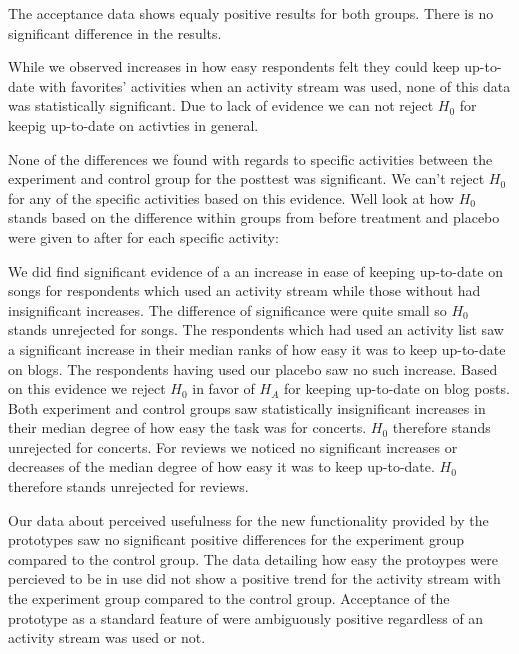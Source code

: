 The acceptance data shows equaly positive results for both groups. There is no
significant difference in the results.

\parabreak

While we observed increases in how easy respondents felt they could keep
up-to-date with favorites' activities when an activity stream was used,
none of this data was statistically significant. Due to lack of evidence we
can not reject $H_0$ for keepig up-to-date on activties in general.

None of the differences we found with regards to specific activities between
the experiment and control group for the posttest was significant.
We can't reject $H_0$ for any of the specific activities based on this
evidence. Well look at how $H_0$ stands based on the difference within groups
from before treatment and placebo were given to after for each specific
activity:

\begin{items}
   We did find significant evidence
    of a an increase in ease of keeping up-to-date on songs for respondents
    which used an activity stream while those without had insignificant
    increases. The difference of significance were quite small so $H_0$
    stands unrejected for songs.
   The respondents which had used an activity list saw a
    significant increase in their median ranks of how easy it was
    to keep up-to-date on blogs. The respondents having used our placebo
    saw no such increase. Based on this evidence we reject $H_0$ in favor
    of $H_A$ for keeping up-to-date on blog posts.
   Both experiment and control groups saw
    statistically insignificant increases in their median degree of how easy
    the task was for concerts. $H_0$ therefore stands unrejected for concerts.
   For reviews we noticed no significant increases or decreases
    of the median degree of how easy it was to keep up-to-date. 
    $H_0$ therefore stands unrejected for reviews.
\end{items}

Our data about perceived usefulness for the new functionality provided
by the prototypes saw no significant positive differences for the experiment
group compared to the control group. The data detailing how easy the protoypes
were percieved to be in use did not show a positive trend for the activity
stream with the experiment group compared to the control group.
Acceptance of the prototype as a standard feature of \urort{} were ambiguously
positive regardless of an activity stream was used or not.

